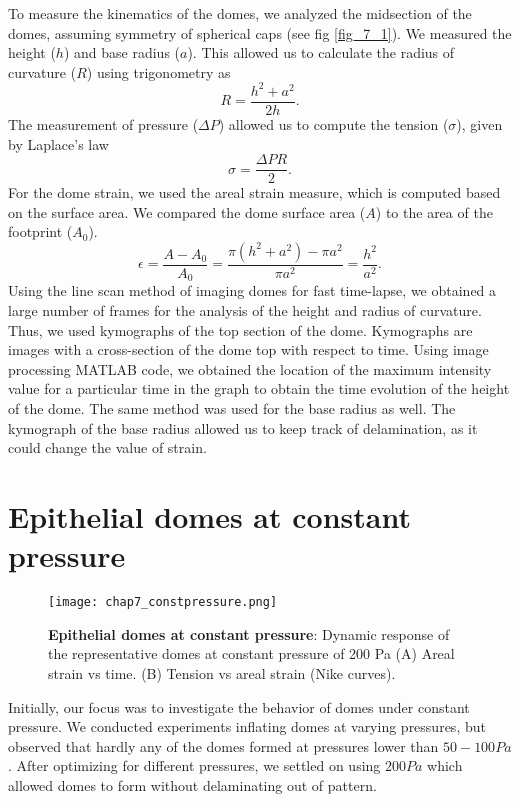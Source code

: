 To measure the kinematics of the domes, we analyzed the midsection of the domes, assuming symmetry of spherical caps (see fig \ref{fig_7_1}). We measured the height ($h$) and base radius ($a$). This allowed us to calculate the radius of curvature ($R$) using trigonometry as 
$$ R = \frac{h^2 + a^2}{2h}.$$ 
The measurement of pressure ($\Delta P$) allowed us to compute the tension ($\sigma$), given by Laplace's law 
$$\sigma = \frac{\Delta PR }{2} .$$
For the dome strain, we used the areal strain measure, which is computed based on the surface area. We compared the dome surface area ($A$) to the area of the footprint ($A_{0}$).
$$ \epsilon = \frac{A - A_{0}}{A_{0}} = \frac{\pi(h^2 + a^2) - \pi a^2}{\pi a^2} = \frac{h^2}{a^2} .$$
Using the line scan method of imaging domes for fast time-lapse, we obtained a large number of frames for the analysis of the height and radius of curvature. Thus, we used kymographs of the top section of the dome. Kymographs are images with a cross-section of the dome top with respect to time. Using image processing MATLAB code, we obtained the location of the maximum intensity value for a particular time in the graph to obtain the time evolution of the height of the dome. The same method was used for the base radius as well. The kymograph of the base radius allowed us to keep track of delamination, as it could change the value of strain.

\hypertarget{epithelial-domes-at-constant-pressure}{%
	\section{Epithelial domes at constant
		pressure}\label{epithelial-domes-at-constant-pressure}}


\begin{figure}
	\centering
	\texttt{[image: chap7\_constpressure.png]}
	\caption{\label{fig_7_3} \textbf{Epithelial domes at constant pressure}: Dynamic response of the representative domes at constant pressure of 200 Pa (A) Areal strain vs time. (B) Tension vs areal strain (Nike curves).
	}
\end{figure}

Initially, our focus was to investigate the behavior of domes under constant pressure. We conducted experiments inflating domes at varying pressures, but observed that hardly any of the domes formed at pressures lower than $50-100 Pa$. After optimizing for different pressures, we settled on using $200 Pa$ which allowed domes to form without delaminating out of pattern.

